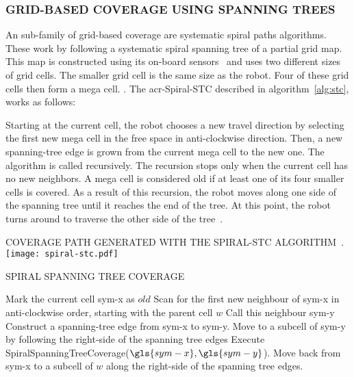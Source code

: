 \subsubsection{GRID-BASED COVERAGE USING SPANNING TREES}
An sub-family of grid-based coverage are systematic spiral paths algorithms. These work by following a systematic spiral
spanning tree of a partial grid map. This map is constructed using its on-board sensors~\cite{galceran_coverage_2014}
and uses two different sizes of grid cells. The smaller grid cell is the same size as the robot. Four of these grid
cells then form a mega cell. \cite{wong_qualitative_2006}. The \gls{acr-Spiral-STC} described in
algorithm~\ref{alg:stc}, works as follows:

Starting at the current cell, the robot chooses a new travel direction by selecting the first new mega cell in the free
space in anti-clockwise direction. Then, a new spanning-tree edge is grown from the current mega cell to the new one.
The algorithm is called recursively. The recursion stops only when the current cell has no new neighbors. A mega cell is
considered old if at least one of its four smaller cells is covered. As a result of this recursion, the robot moves
along one side of the spanning tree until it reaches the end of the tree. At this point, the robot turns around to
traverse the other side of the tree~\cite{galceran_coverage_2014}.

\begin{RoyalFigure}[!htb, label=]{COVERAGE PATH GENERATED WITH THE SPIRAL-STC ALGORITHM~\cite{galceran_survey_2013}.}
    \texttt{[image: spiral-stc.pdf]}
\end{RoyalFigure}

\begin{RoyalAlgorithm}[label=alg:stc]{SPIRAL SPANNING TREE COVERAGE}
    \begin{algorithmic}[1]
            \State Mark the current cell \gls{sym-x} as $ old $
                \State Scan for the first new neighbour of \gls{sym-x} in anti-clockwise order, starting with the 
				parent cell $ w $ Call this neighbour \gls{sym-y}
                \State Construct a spanning-tree edge from \gls{sym-x} to \gls{sym-y}.
                \State Move to a subcell of \gls{sym-y} by following the right-side of the spanning tree edges
                \State Execute SpiralSpanningTreeCoverage($\gls{sym-x},\gls{sym-y}$).
            \EndWhile
                \State Move back from \gls{sym-x} to a subcell of $ w $ along the right-side of the spanning tree edges.
            \EndIf
        \EndProcedure
    \end{algorithmic}
\end{RoyalAlgorithm}

